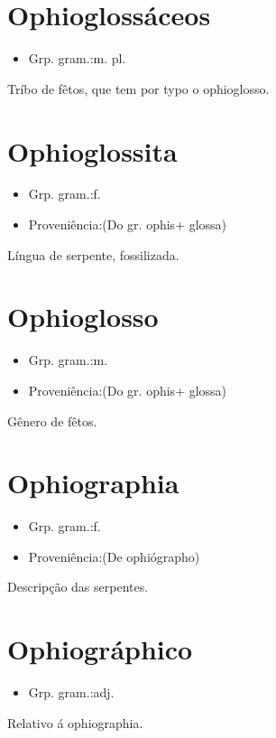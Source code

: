 \section{Ophioglossáceos}
\begin{itemize}
\item {Grp. gram.:m. pl.}
\end{itemize}
Tríbo de fêtos, que tem por typo o ophioglosso.
\section{Ophioglossita}
\begin{itemize}
\item {Grp. gram.:f.}
\end{itemize}
\begin{itemize}
\item {Proveniência:(Do gr. \textunderscore ophis\textunderscore  + \textunderscore glossa\textunderscore )}
\end{itemize}
Língua de serpente, fossilizada.
\section{Ophioglosso}
\begin{itemize}
\item {Grp. gram.:m.}
\end{itemize}
\begin{itemize}
\item {Proveniência:(Do gr. \textunderscore ophis\textunderscore  + \textunderscore glossa\textunderscore )}
\end{itemize}
Gênero de fêtos.
\section{Ophiographia}
\begin{itemize}
\item {Grp. gram.:f.}
\end{itemize}
\begin{itemize}
\item {Proveniência:(De \textunderscore ophiógrapho\textunderscore )}
\end{itemize}
Descripção das serpentes.
\section{Ophiográphico}
\begin{itemize}
\item {Grp. gram.:adj.}
\end{itemize}
Relativo á ophiographia.
